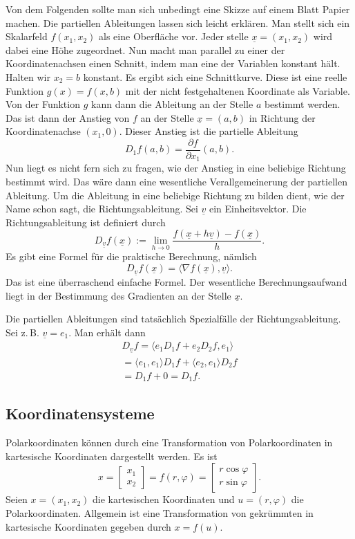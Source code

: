 \documentclass[a4paper,10pt,fleqn,twocolumn,twoside]{article}
\begin{document}
Von dem Folgenden sollte man sich unbedingt eine Skizze auf einem
Blatt Papier machen. Die partiellen Ableitungen lassen sich leicht
erklären. Man stellt sich ein Skalarfeld $f(x_1,x_2)$ als eine
Oberfläche vor. Jeder stelle $\underline x=(x_1,x_2)$ wird dabei
eine Höhe zugeordnet. Nun macht man parallel zu einer der
Koordinatenachsen einen Schnitt, indem man eine der Variablen
konstant hält. Halten wir $x_2=b$ konstant. Es ergibt sich
eine Schnittkurve. Diese ist eine reelle Funktion $g(x)=f(x,b)$
mit der nicht festgehaltenen Koordinate als Variable.
Von der Funktion $g$ kann dann die Ableitung an der Stelle $a$
bestimmt werden. Das ist dann der Anstieg von $f$ an der Stelle
$\underline x=(a,b)$ in Richtung der Koordinatenachse $(x_1,0)$.
Dieser Anstieg ist die partielle Ableitung
\[D_1 f(a,b) = \frac{\partial f}{\partial x_1}(a,b).\]
%
Nun liegt es nicht fern sich zu fragen, wie der Anstieg in eine
beliebige Richtung bestimmt wird. Das wäre dann eine wesentliche
Verallgemeinerung der partiellen Ableitung.
%
Um die Ableitung in eine beliebige Richtung zu bilden dient, wie der
Name schon sagt, die Richtungsableitung. Sei $\underline v$
ein Einheitsvektor. Die Richtungsableitung ist definiert durch
\[D_{\underline v} f(\underline x) := \lim_{h\rightarrow 0}
\frac{f(\underline x+h\underline v)-f(\underline x)}{h}.\]
Es gibt eine Formel für die praktische Berechnung, nämlich
\[D_{\underline v} f(\underline x)
= \langle\nabla f(\underline x),\underline v\rangle.\]
Das ist eine überraschend einfache Formel. Der wesentliche
Berechnungsaufwand liegt in der Bestimmung des Gradienten
an der Stelle $\underline x$.

Die partiellen Ableitungen sind tatsächlich Spezialfälle der
Richtungsableitung. Sei z.\,B. $\underline v=e_1$. Man erhält dann
\begin{gather*}
D_{\underline v} f
= \langle e_1 D_1f+e_2 D_2 f, e_1\rangle\\
= \langle e_1, e_1\rangle D_1f  + \langle e_2, e_1\rangle D_2 f\\
= D_1f+0 = D_1f.
\end{gather*}

\subsection{Koordinatensysteme}

Polarkoordinaten können durch eine Transformation von
Polarkoordinaten in kartesische Koordinaten dargestellt werden.
Es ist
\[x = \begin{bmatrix}
x_1\\ x_2 \end{bmatrix}
= f(r,\varphi) = \begin{bmatrix}
r\cos\varphi\\
r\sin\varphi
\end{bmatrix}.\]
Seien $x=(x_1,x_2)$ die kartesischen Koordinaten und
$u=(r,\varphi)$ die Polarkoordinaten. Allgemein ist eine
Transformation von gekrümmten in kartesische Koordinaten gegeben durch
$x=f(u).$
\end{document}
